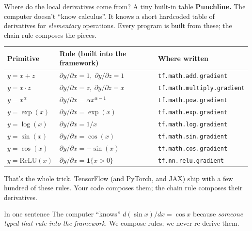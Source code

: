 \documentclass[aspectratio=169,11pt]{beamer}
\newcommand{\emphc}[1]{\textcolor{harvardcrimson}{#1}}
\begin{document}
\begin{frame}[shrink=20]{Where do the local derivatives come from? A tiny built-in table}
\footnotesize
\textbf{Punchline.} The computer doesn't ``know calculus''. It knows a short \emphc{hardcoded table} of derivatives for \emph{elementary} operations. Every program is built from these; the chain rule composes the pieces.
\vspace{4pt}
\begin{center}
\renewcommand{\arraystretch}{1.15}
\begin{tabular}{p{3.0cm} p{3.0cm} p{5.8cm}}
\toprule
\textbf{Primitive} & \textbf{Rule (built into the framework)} & \textbf{Where written} \\
\midrule
$y = x + z$ & $\partial y/\partial x = 1,\; \partial y/\partial z = 1$ & \texttt{tf.math.add.gradient} \\
$y = x \cdot z$ & $\partial y/\partial x = z,\; \partial y/\partial z = x$ & \texttt{tf.math.multiply.gradient} \\
$y = x^{\alpha}$ & $\partial y/\partial x = \alpha x^{\alpha-1}$ & \texttt{tf.math.pow.gradient} \\
$y = \exp(x)$ & $\partial y/\partial x = \exp(x)$ & \texttt{tf.math.exp.gradient} \\
$y = \log(x)$ & $\partial y/\partial x = 1/x$ & \texttt{tf.math.log.gradient} \\
$y = \sin(x)$ & $\partial y/\partial x = \cos(x)$ & \texttt{tf.math.sin.gradient} \\
$y = \cos(x)$ & $\partial y/\partial x = -\sin(x)$ & \texttt{tf.math.cos.gradient} \\
$y = \mathrm{ReLU}(x)$ & $\partial y/\partial x = \mathbf{1}\{x > 0\}$ & \texttt{tf.nn.relu.gradient} \\
\bottomrule
\end{tabular}
\end{center}
\vspace{4pt}
That's the whole trick. TensorFlow (and PyTorch, and JAX) ship with a few hundred of these rules. Your code composes them; the chain rule composes their derivatives.
\vspace{4pt}
\begin{exampleblock}{In one sentence}
\footnotesize The computer ``knows'' $d(\sin x)/dx = \cos x$ because \emph{someone typed that rule into the framework}. We compose rules; we never re-derive them.
\end{exampleblock}
\end{frame}
\end{document}
